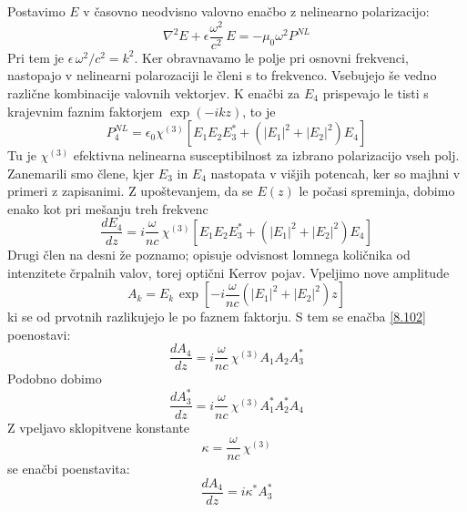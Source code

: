 Postavimo $E$ v časovno neodvisno valovno enačbo z nelinearno polarizacijo:
\begin{equation}
\nabla^{2}E+\epsilon\frac{\omega^{2}}{c^{2}}\, E=-\mu_{0}\omega^{2}P^{NL}\label{8.100}
\end{equation}
 Pri tem je $\epsilon\,\omega^{2}/c^{2}=k^{2}$. Ker obravnavamo le
polje pri osnovni frekvenci, nastopajo v nelinearni polarozaciji le
členi s to frekvenco. Vsebujejo še vedno različne kombinacije valovnih
vektorjev. K enačbi za $E_{4}$ prispevajo le tisti s krajevnim faznim
faktorjem $\exp(-ikz)$, to je 
\begin{equation}
P_{4}^{NL}=\epsilon_{0}\chi^{\left(3\right)}[E_{1}E_{2}E_{3}^{*}+(\left|E_{1}\right|^{2}+\left|E_{2}\right|^{2})E_{4}]\label{8.101}
\end{equation}
 Tu je $\chi^{\left(3\right)}$ efektivna nelinearna susceptibilnost
za izbrano polarizacijo vseh polj. Zanemarili smo člene, kjer $E_{3}$
in $E_{4}$ nastopata v višjih potencah, ker so majhni v primeri z
zapisanimi. Z upoštevanjem, da se $E\left(z\right)$ le počasi spreminja,
dobimo enako kot pri mešanju treh frekvenc 
\begin{equation}
\frac{dE_{4}}{dz}=i\frac{\omega}{nc}\,\chi^{\left(3\right)}\left[E_{1}E_{2}E_{3}^{*}+(\left|E_{1}\right|^{2}+\left|E_{2}\right|^{2})E_{4}\right]\label{8.102}
\end{equation}
 Drugi člen na desni že poznamo; opisuje odvisnost lomnega količnika
od intenzitete črpalnih valov, torej optični Kerrov pojav. Vpeljimo
nove amplitude 
\begin{equation}
A_{k}=E_{k\,}\exp\left[-i\frac{\omega}{nc}\left(\left|E_{1}\right|^{2}+\left|E_{2}\right|^{2}\right)z\right]\label{8.103}
\end{equation}
 ki se od prvotnih razlikujejo le po faznem faktorju. S tem se enačba
\ref{8.102} poenostavi: 
\begin{equation}
\frac{dA_{4}}{dz}=i\frac{\omega}{nc}\,\chi^{\left(3\right)}A_{1}A_{2}A_{3}^{*}\label{8.104}
\end{equation}
 Podobno dobimo 
\begin{equation}
\frac{dA_{3}^{*}}{dz}=i\frac{\omega}{nc}\,\chi^{\left(3\right)}A_{1}^{*}A_{2}^{*}A_{4}\label{8.105}
\end{equation}
 Z vpeljavo sklopitvene konstante 
\begin{equation}
\kappa=\frac{\omega}{nc}\,\chi^{\left(3\right)}\label{8.106}
\end{equation}
 se enačbi poenstavita: 
\[
\frac{dA_{4}}{dz}=i\kappa^{*}A_{3}^{*}
\]
 

